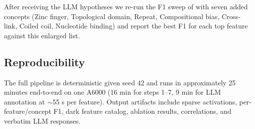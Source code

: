 After receiving the LLM hypotheses we re-run the F1 sweep of  with seven added concepts (Zinc finger, Topological domain, Repeat, Compositional bias, Cross-link, Coiled coil, Nucleotide binding) and report the best F1 for each top feature against this enlarged list.

\subsection{Reproducibility}

The full pipeline is deterministic given seed 42 and runs in approximately 25 minutes end-to-end on one A6000 (16 min for steps 1--7, 9 min for LLM annotation at $\sim$55 s per feature). Output artifacts include sparse \sae activations, per-feature/concept F1, dark feature catalog, ablation results, \proteingym correlations, and verbatim LLM responses.
